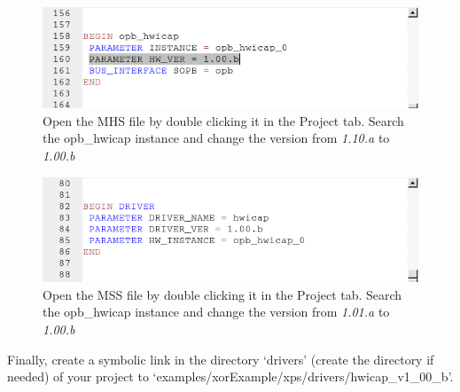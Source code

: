 \documentclass[a4paper,oneside]{memoir}
\begin{document}
\begin{figure}[H]
\centering
\includegraphics[scale=0.5]{HWICAP3}
\caption{Open the MHS file by double clicking it in the Project tab. Search the opb\_hwicap instance and change the version from \emph{1.10.a} to \emph{1.00.b}\label{fig:HWICAP3}}
\end{figure}
\begin{figure}[H]
\centering
\includegraphics[scale=0.5]{HWICAP4}
\caption{Open the MSS file by double clicking it in the Project tab. Search the opb\_hwicap instance and change the version from \emph{1.01.a} to \emph{1.00.b}\label{fig:HWICAP4}}
\end{figure}

Finally, create a symbolic link in the directory `drivers' (create the directory if needed) of your project to `examples/xorExample/xps/drivers/hwicap\_v1\_00\_b'.
\end{document}
